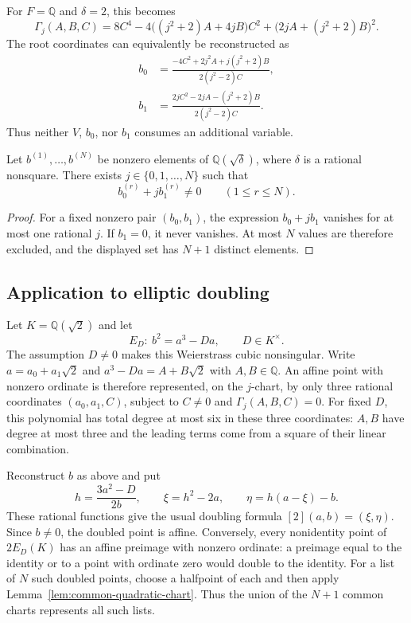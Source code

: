 For $F=\mathbb Q$ and $\delta=2$, this becomes
\[
 \Gamma_j(A,B,C)=
 8C^4-4\bigl((j^2+2)A+4jB\bigr)C^2
 +\bigl(2jA+(j^2+2)B\bigr)^2.
\]
The root coordinates can equivalently be reconstructed as
\begin{align*}
 b_0&=\frac{-4C^2+2j^2A+j(j^2+2)B}{2(j^2-2)C},\\
 b_1&=\frac{2jC^2-2jA-(j^2+2)B}{2(j^2-2)C}.
\end{align*}
Thus neither $V$, $b_0$, nor $b_1$ consumes an additional variable.

\begin{lemma}
\label{lem:common-quadratic-chart}
Let $b^{(1)},\ldots,b^{(N)}$ be nonzero elements of
$\mathbb Q(\sqrt\delta)$, where $\delta$ is a rational nonsquare.
There exists $j\in\{0,1,\ldots,N\}$ such that
\[
 b^{(r)}_0+j b^{(r)}_1\ne0\qquad(1\leq r\leq N).
\]
\end{lemma}
\begin{proof}
For a fixed nonzero pair $(b_0,b_1)$, the expression $b_0+jb_1$
vanishes for at most one rational $j$.  If $b_1=0$, it never
vanishes.  At most $N$ values are therefore excluded, and the
displayed set has $N+1$ distinct elements.
\end{proof}

\subsection{Application to elliptic doubling}

Let $K=\mathbb Q(\sqrt2)$ and let
\[
 E_D:\ b^2=a^3-Da,\qquad D\in K^\times.
\]
The assumption $D\ne0$ makes this Weierstrass cubic nonsingular.
Write $a=a_0+a_1\sqrt2$ and
$a^3-Da=A+B\sqrt2$ with $A,B\in\mathbb Q$.
An affine point with nonzero ordinate is therefore represented,
on the $j$-chart, by only three rational coordinates
$(a_0,a_1,C)$, subject to $C\ne0$ and $\Gamma_j(A,B,C)=0$.
For fixed $D$, this polynomial has total degree at most six in these
three coordinates: $A,B$ have degree at most three and the leading
terms come from a square of their linear combination.

Reconstruct $b$ as above and put
\[
 h=\frac{3a^2-D}{2b},\qquad
 \xi=h^2-2a,\qquad \eta=h(a-\xi)-b.
\]
These rational functions give the usual doubling formula
$[2](a,b)=(\xi,\eta)$.  Since $b\ne0$, the doubled point is affine.
Conversely, every nonidentity point of $2E_D(K)$ has an affine
preimage with nonzero ordinate: a preimage equal to the identity or
to a point with ordinate zero would double to the identity.
For a list of $N$ such doubled points, choose a halfpoint of each
and then apply Lemma~\ref{lem:common-quadratic-chart}.  Thus the
union of the $N+1$ common charts represents all such lists.

